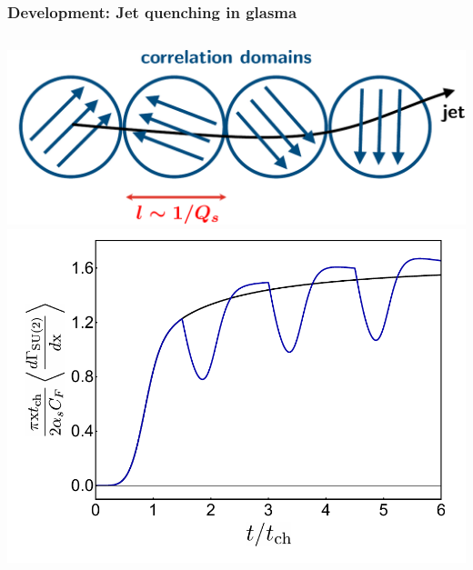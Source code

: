 \documentclass[aspectratio=169,11pt,usenames,dvipsnames]{beamer}
\begin{document}
\begin{frame}[noframenumbering]
    \frametitle{{\normalsize\color{jyured}\bfseries\sffamily Development: }Jet quenching in glasma}
    \vspace{-15pt}
    \begin{center}
        \begin{columns}[onlytextwidth,t]
            \vspace{5pt}
            \begin{center}
                \includegraphics[width=0.88\columnwidth]{images/glasma_corr_dom_jet.pdf}
                \\[5pt]
                \includegraphics[width=0.9\columnwidth]{images/su2manyall.pdf}
            \end{center}


\end{columns}
\end{center}
\end{frame}
\end{document}
